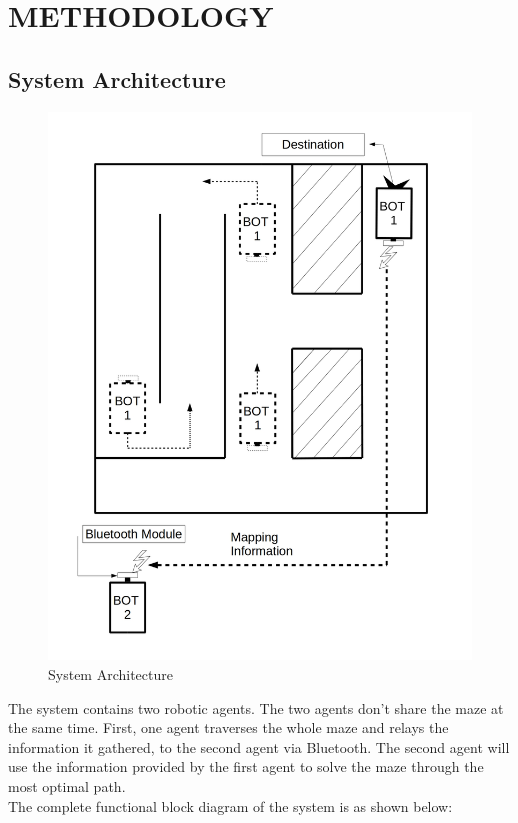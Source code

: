 \section{METHODOLOGY}
\subsection{System Architecture}
\begin{figure}[h]
\center
\includegraphics[scale=0.25]{systemblockdiagram_new.jpg} 
\caption{System Architecture}
\end{figure}
\justify The system contains two robotic agents. The two agents don't share the maze at the same time. First, one agent traverses the whole maze and relays the information it gathered, to the second agent via Bluetooth. The second agent will use the information provided by the first agent to solve the maze through the most optimal path. \\
The complete functional block diagram of the system is as shown below:
